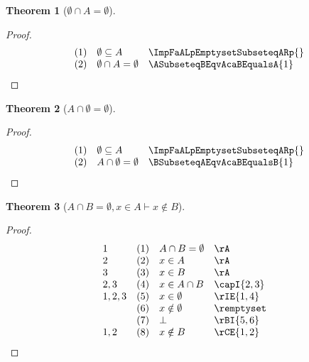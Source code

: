 \documentclass{book}
\theoremstyle{plain}
\newtheorem{theorem}{Theorem}
\theoremstyle{remark}
\theoremstyle{definition}
\begin{document}
\label{EmptysetcaAEqualsEmptyset}
\begin{theorem}[\(\emptyset\cap A = \emptyset\)]
\end{theorem}
\begin{proof}
    \[
	\begin{array}{llll}
	   & (1) & \emptyset\subseteq A & \ImpFaALpEmptysetSubseteqARp{} \\
	   & (2) & \emptyset\cap A  = \emptyset & \ASubseteqBEqvAcaBEqualsA{1} \\
	\end{array}
    \]
\end{proof}

\label{AcaEmptysetEqualsEmptyset}
\begin{theorem}[\(A\cap\emptyset = \emptyset\)]
\end{theorem}
\begin{proof}
    \[
	\begin{array}{llll}
	   & (1) & \emptyset\subseteq A & \ImpFaALpEmptysetSubseteqARp{} \\
	   & (2) & A\cap\emptyset = \emptyset & \BSubseteqAEqvAcaBEqualsB{1} \\
	\end{array}
    \]
\end{proof}

\label{AcaBEqualsEmptysetwxInAImpxNotinB}
\begin{theorem}[\(A\cap B = \emptyset, x\in A\vdash x\notin B\)]
\end{theorem}
\begin{proof}
    \[
	\begin{array}{llll}
            1       & (1) & A\cap B = \emptyset & \rA \\
	    2       & (2) & x\in A & \rA \\
            3       & (3) & x\in B & \rA \\
            2,3     & (4) & x\in A\cap B & \capI{2,3} \\
            1,2,3   & (5) & x\in \emptyset & \rIE{1,4} \\
                    & (6) & x\notin \emptyset & \remptyset \\
                    & (7) & \bot & \rBI{5,6} \\           
            1,2     & (8) & x\notin B & \rCE{1,2} \\  
	\end{array}
    \]
\end{proof}
\end{document}
